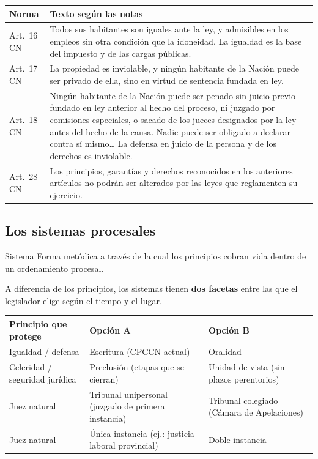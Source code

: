 \documentclass[12pt,oneside]{book}
\renewcommand{\arraystretch}{1.15}
\begin{document}
\begin{table}[H]
\centering
\renewcommand{\arraystretch}{1.2}
\begin{tabularx}{\textwidth}{>{\RaggedRight\arraybackslash}p{3.2cm}>{\RaggedRight\arraybackslash}X}
\toprule
\textbf{Norma} & \textbf{Texto según las notas} \\
\midrule
Art.~16 CN & Todos sus habitantes son iguales ante la ley, y admisibles en los empleos sin otra condición que la idoneidad. La igualdad es la base del impuesto y de las cargas públicas. \\
\addlinespace
Art.~17 CN & La propiedad es inviolable, y ningún habitante de la Nación puede ser privado de ella, sino en virtud de sentencia fundada en ley. \\
\addlinespace
Art.~18 CN & Ningún habitante de la Nación puede ser penado sin juicio previo fundado en ley anterior al hecho del proceso, ni juzgado por comisiones especiales, o sacado de los jueces designados por la ley antes del hecho de la causa. Nadie puede ser obligado a declarar contra sí mismo\ldots{} La defensa en juicio de la persona y de los derechos es inviolable. \\
\addlinespace
Art.~28 CN & Los principios, garantías y derechos reconocidos en los anteriores artículos no podrán ser alterados por las leyes que reglamenten su ejercicio. \\
\bottomrule
\end{tabularx}
\end{table}

\subsection{Los sistemas procesales}

\begin{definicion}{Sistema}
Forma metódica a través de la cual los principios cobran vida dentro de un ordenamiento procesal.
\end{definicion}

A diferencia de los principios, los sistemas tienen \textbf{dos facetas} entre las que el legislador elige según el tiempo y el lugar.

\begin{table}[H]
\centering
\renewcommand{\arraystretch}{1.2}
\small
\begin{tabularx}{\textwidth}{>{\RaggedRight\arraybackslash}p{3cm}>{\RaggedRight\arraybackslash}X>{\RaggedRight\arraybackslash}X}
\toprule
\textbf{Principio que protege} & \textbf{Opción A} & \textbf{Opción B} \\
\midrule
Igualdad / defensa & Escritura (CPCCN actual) & Oralidad \\
Celeridad / seguridad jurídica & Preclusión (etapas que se cierran) & Unidad de vista (sin plazos perentorios) \\
Juez natural & Tribunal unipersonal (juzgado de primera instancia) & Tribunal colegiado (Cámara de Apelaciones) \\
Juez natural & Única instancia (ej.: justicia laboral provincial) & Doble instancia \\
\bottomrule
\end{tabularx}
\end{table}
\end{document}
